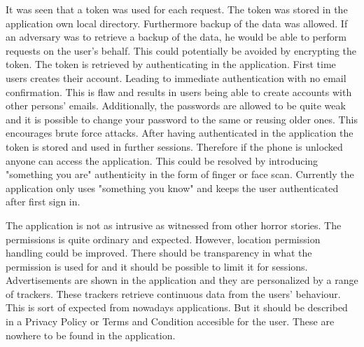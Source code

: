 It was seen that a token was used for each request. The token was stored in the application own local directory. Furthermore backup of the data was allowed. If an adversary was to retrieve a backup of the data, he would be able to perform requests on the user's behalf. This could potentially be avoided by encrypting the token. The token is retrieved by authenticating in the application. First time users creates their account. Leading to immediate authentication with no email confirmation. This is flaw and results in users being able to create accounts with other persons' emails. Additionally, the passwords are allowed to be quite weak and it is possible to change your password to the same or reusing older ones. This encourages brute force attacks. After having authenticated in the application the token is stored and used in further sessions. Therefore if the phone is unlocked anyone can access the application. This could be resolved by introducing "something you are" authenticity in the form of finger or face scan. Currently the application only uses "something you know" and keeps the user authenticated after first sign in.  

The application is not as intrusive as witnessed from other horror stories. The permissions is quite ordinary and expected. However, location permission handling could be improved. There should be transparency in what the permission is used for and it should be possible to limit it for sessions. Advertisements are shown in the application and they are personalized by a range of trackers. These trackers retrieve continuous data from the users' behaviour. This is sort of expected from nowadays applications. But it should be described in a Privacy Policy or Terms and Condition accesible for the user. These are nowhere to be found in the application.